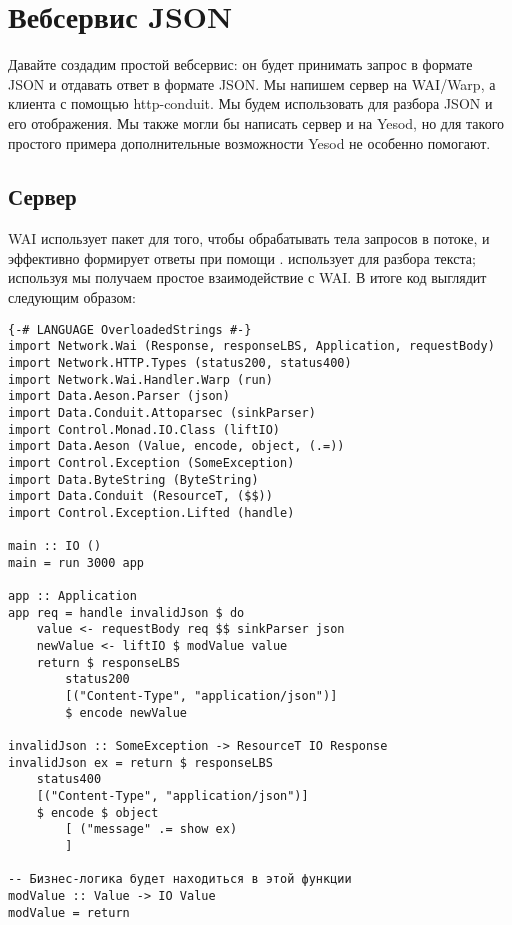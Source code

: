 \chapter {Вебсервис JSON}\label{chap:json_web_service}

Давайте создадим простой вебсервис: он будет принимать запрос в формате JSON и отдавать ответ в формате JSON. Мы напишем сервер на WAI/Warp, а клиента с помощью {http-conduit}. Мы будем использовать  для разбора JSON и его отображения. Мы также могли бы написать сервер и на  Yesod, но для такого простого примера дополнительные возможности Yesod не особенно помогают.

\section {Сервер}

WAI использует пакет  для того, чтобы обрабатывать тела запросов в потоке, и эффективно формирует ответы при помощи .  использует  для разбора текста; используя  мы получаем простое взаимодействие с WAI. В итоге код выглядит следующим образом:

\begin{lstlisting}
{-# LANGUAGE OverloadedStrings #-}
import Network.Wai (Response, responseLBS, Application, requestBody)
import Network.HTTP.Types (status200, status400)
import Network.Wai.Handler.Warp (run)
import Data.Aeson.Parser (json)
import Data.Conduit.Attoparsec (sinkParser)
import Control.Monad.IO.Class (liftIO)
import Data.Aeson (Value, encode, object, (.=))
import Control.Exception (SomeException)
import Data.ByteString (ByteString)
import Data.Conduit (ResourceT, ($$))
import Control.Exception.Lifted (handle)

main :: IO ()
main = run 3000 app

app :: Application
app req = handle invalidJson $ do
    value <- requestBody req $$ sinkParser json
    newValue <- liftIO $ modValue value
    return $ responseLBS
        status200
        [("Content-Type", "application/json")]
        $ encode newValue

invalidJson :: SomeException -> ResourceT IO Response
invalidJson ex = return $ responseLBS
    status400
    [("Content-Type", "application/json")]
    $ encode $ object
        [ ("message" .= show ex)
        ]

-- Бизнес-логика будет находиться в этой функции
modValue :: Value -> IO Value
modValue = return
\end{lstlisting}%

